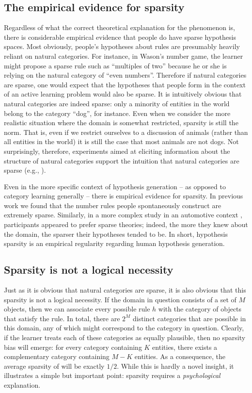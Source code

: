 \documentclass{apa}
\begin{document}
\subsection{The empirical evidence for sparsity}

Regardless of what the correct theoretical explanation for the phenomenon is, there is considerable empirical evidence that people do have sparse hypothesis spaces. Most obviously, people's hypotheses about rules are presumably heavily reliant on natural categories. For instance, in Wason's number game, the learner might propose a sparse rule such as ``multiples of two'' because he or she is relying on the natural category of ``even numbers''. Therefore if natural categories are sparse, one would expect that the hypotheses that people form in the context of an active learning problem would also be sparse. It is intuitively obvious that natural categories are indeed sparse: only a minority of entities in the world belong to the category ``dog'', for instance. Even when we consider the more realistic situation where the domain is somewhat restricted, sparsity is still the norm. That is, even if we restrict ourselves to a discussion of animals (rather than all entities in the world) it is still the case that most animals are not dogs. Not surprisingly, therefore, experiments aimed at eliciting information about the structure of natural categories support the intuition that natural categories are sparse (e.g., ).

Even in the more specific context of hypothesis generation -- as opposed to category learning generally -- there is empirical evidence for sparsity. In previous work \cite{perforsnavarro09} we found that the number rules people spontaneously construct are extremely sparse.  Similarly, in a more complex study in an automotive context \cite{mehle82}, participants  appeared to prefer sparse theories; indeed, the more they knew about the domain, the sparser their hypotheses tended to be. In short, hypothesis sparsity is an empirical regularity regarding human hypothesis generation.


\subsection{Sparsity is not a logical necessity}

Just as it is obvious that natural categories are sparse, it is also obvious that this sparsity is not a logical necessity. If the domain in question consists of a set of $M$ objects, then we can associate every possible rule $h$ with the category of objects that satisfy the rule. In total, there are $2^M$ distinct categories that are possible in this domain, any of which might correspond to the category in question. Clearly, if the learner treats each of these categories as equally plausible, then no sparsity bias will emerge: for every category containing $K$ entities, there exists a complementary category containing $M-K$ entities. As a consequence, the average sparsity of will be exactly $1/2$. While this is hardly a novel insight, it illustrates a simple but important point: sparsity requires a {\it psychological} explanation.
\end{document}
